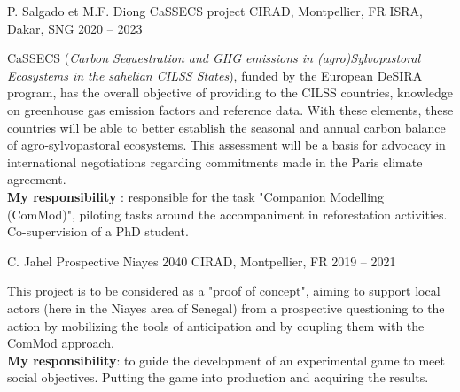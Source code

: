 

\begin{cventries}

  \cventry
    {P. Salgado et M.F. Diong} %
    {CaSSECS project} %
    {CIRAD, Montpellier, FR \hspace{5em} ISRA, Dakar, SNG} %
    {2020 -- 2023} %
    {
      \begin{cvitems} %
        CaSSECS (\emph{Carbon Sequestration and GHG emissions in (agro)Sylvopastoral Ecosystems in the sahelian CILSS States}), funded by the European DeSIRA program, has the overall objective of providing to the CILSS countries, knowledge on greenhouse gas emission factors and reference data. With these elements, these countries will be able to better establish the seasonal and annual carbon balance of agro-sylvopastoral ecosystems. This assessment will be a basis for advocacy in international negotiations regarding commitments made in the Paris climate agreement.\\
        \textbf{My responsibility} : responsible for the task "Companion Modelling (ComMod)", piloting tasks around the accompaniment in reforestation activities. Co-supervision of a PhD student.
      \end{cvitems}
    }

  \cventry
  {C. Jahel} %
  {Prospective Niayes 2040} %
  {CIRAD, Montpellier, FR} %
  {2019 -- 2021} %
  {
    \begin{cvitems} %
      This project is to be considered as a "proof of concept", aiming to support local actors (here in the Niayes area of Senegal) from a prospective questioning to the action by mobilizing the tools of anticipation and by coupling them with the ComMod approach.\\
      \textbf{My responsibility}: to guide the development of an experimental game to meet social objectives. Putting the game into production and acquiring the results.
    \end{cvitems}
  }


\end{cventries}
